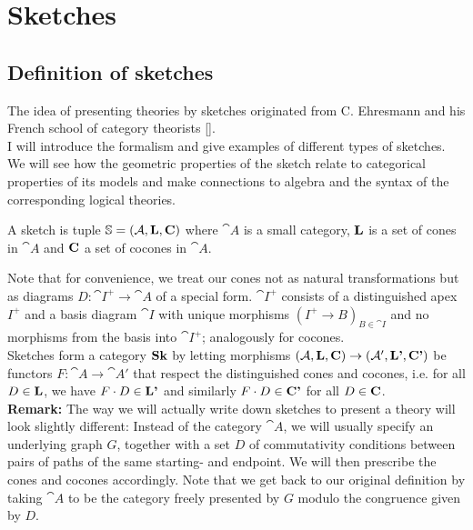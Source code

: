 \section{Sketches}
\label{sec:sketches}

\subsection{Definition of sketches}

The idea of presenting theories by sketches originated from C. Ehresmann and his French school of category theorists []. \\

I will introduce the formalism and give examples of different types of sketches. We will see how the geometric properties of the sketch relate to categorical properties of its models and make connections to algebra and the syntax of the corresponding logical theories. %

\begin{Definition}[Sketch]
A sketch is tuple $\mathbb S = (\mathcal{A}, \textbf{L}, \textbf{C})$ where $\cat A$ is a small category, $\textbf{L}$ is a set of cones in $\cat A$ and $\textbf{C}$ a set of cocones in $\cat A$.
\end{Definition}

Note that for convenience, we treat our cones not as natural transformations but as diagrams $D : \cat I^+ \to \cat A$ of a special form. $\cat I^+$ consists of a distinguished apex $I^+$ and a basis diagram $\cat I$ with unique morphisms $(I^+ \to B)_{B \in \cat I}$ and no morphisms from the basis into $\cat I^+$; analogously for cocones. \\

Sketches form a category $\mathbf{Sk}$ by letting morphisms $(\mathcal{A}, \textbf{L}, \textbf{C}) \to (\mathcal{A}', \textbf{L'}, \textbf{C'})$ be functors $F : \cat A \to \cat A'$ that respect the distinguished cones and cocones, i.e. for all $D \in \textbf{L}$, we have $F \cdot D \in \textbf{L'}$ and similarly $F \cdot D \in \textbf{C'}$ for all $D \in \textbf{C}$. \\

\textbf{Remark: } The way we will actually write down sketches to present a theory will look slightly different: Instead of the category $\cat A$, we will usually specify an underlying graph $G$, together with a set $D$ of commutativity conditions between pairs of paths of the same starting- and endpoint. We will then prescribe the cones and cocones accordingly. Note that we get back to our original definition by taking $\cat A$ to be the category freely presented by $G$ modulo the congruence given by $D$. 

